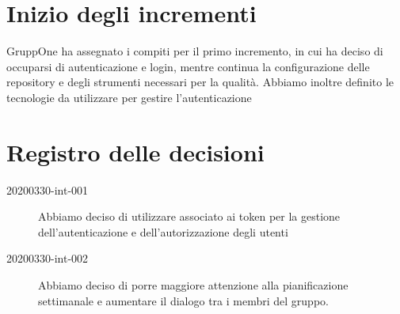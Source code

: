 \documentclass{article}
\begin{document}
\section{Inizio degli incrementi}%
\label{sec:inizio_incrementi}
GruppOne ha assegnato i compiti per il primo incremento, in cui ha deciso di occuparsi di autenticazione e login, mentre continua la configurazione delle repository e degli strumenti necessari per la qualità.
Abbiamo inoltre definito le tecnologie da utilizzare per gestire l'autenticazione
\newpage
\section{Registro delle decisioni}%
\label{sec:registro_delle_decisioni}

\begin{description}
  \item[20200330-int-001] Abbiamo deciso di utilizzare  associato ai token  per la gestione dell'autenticazione e dell'autorizzazione degli utenti
  \item[20200330-int-002] Abbiamo deciso di porre maggiore attenzione alla pianificazione settimanale e aumentare il dialogo tra i membri del gruppo.
\end{description}

\end{document}
